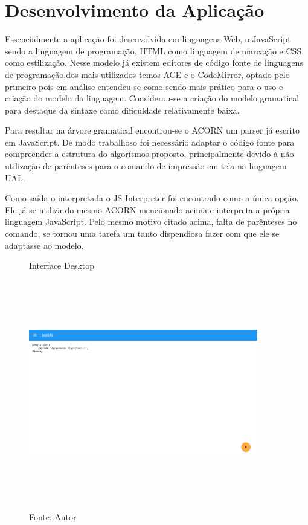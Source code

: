 
\ifdraft{\color{red}}{}\chapter{Desenvolvimento da Aplicação}

Essencialmente a aplicação foi desenvolvida em linguagens Web, o JavaScript sendo a linguagem de programação, HTML como linguagem de marcação e CSS como estilização. Nesse modelo já existem editores de código fonte de linguagens de programação,dos mais utilizados temos ACE e o CodeMirror, optado pelo primeiro pois em análise entendeu-se como sendo mais prático para o uso e criação do modelo da linguagem. Considerou-se a criação do modelo gramatical para destaque da sintaxe como dificuldade relativamente baixa.

Para resultar na árvore gramatical encontrou-se o ACORN um parser já escrito em JavaScript. De modo trabalhoso foi necessário adaptar o código fonte para compreender a estrutura do algorítmos proposto, principalmente devido à não utilização de parênteses para o comando de impressão em tela na linguagem UAL.

Como saída o interpretada o JS-Interpreter foi encontrado como a única opção. Ele já se utiliza do mesmo ACORN mencionado acima e interpreta a própria linguagem JavaScript. Pelo mesmo motivo citado acima, falta de parênteses no comando, se tornou uma tarefa um tanto dispendiosa fazer com que ele se adaptasse ao modelo.

\begin{figure}[h]
  \caption{Interface Desktop}\label{fig:ui-pc}
  \centering
  \includegraphics[width=10cm,height=10cm,keepaspectratio]{figures/bizual-desktop.pdf}
  \caption*{\footnotesize Fonte: Autor}
\end{figure}


